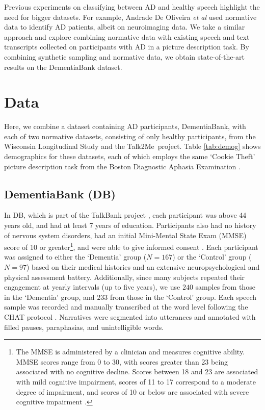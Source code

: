 \documentclass{article}
\newcommand{\talktome}{Talk2Me}
\begin{document}
Previous experiments on classifying between AD and healthy speech highlight the need for bigger datasets. For example, Andrade De Oliveira {\em et al} \cite{AndradeDeOliveira2014} used normative data to identify AD patients, albeit on neuroimaging data. We take a similar approach and explore combining normative data with existing speech and text transcripts collected on participants with AD in a picture description task. By combining synthetic sampling and normative data, we obtain state-of-the-art results on the DementiaBank dataset.


\section{Data}
Here, we combine a dataset containing AD participants, DementiaBank, with each of two normative datasets, consisting of only healthy participants, from the Wisconsin Longitudinal Study and the \talktome\ project. Table \ref{tab:demog} shows demographics for these datasets, each of which employs the same `Cookie Theft' picture description task from the Boston Diagnostic Aphasia Examination \cite{Goodglass1983}.

\subsection{DementiaBank (DB)}
In DB, which is part of the TalkBank project \cite{MacWhinney11}, each participant was above 44 years old, and had at least 7 years of education. Participants also had no history of nervous system disorders, had an initial Mini-Mental State Exam (MMSE) score of 10 or greater\footnote{The MMSE is administered by a clinician and measures cognitive ability. MMSE scores range from 0 to 30, with scores greater than 23 being associated with no cognitive decline. Scores between 18 and 23 are associated with mild cognitive impairment, scores of 11 to 17 correspond to a moderate degree of impairment, and scores of 10 or below are associated with severe cognitive impairment \cite{Folstein1975}.}, and were able to give informed consent \cite{Becker1994}. Each participant was assigned to either the `Dementia' group ($N=167$) or the `Control' group ($N=97$) based on their medical histories and an extensive neuropsychological and physical assessment battery. Additionally, since many subjects repeated their engagement at yearly intervals (up to five years), we use $240$ samples from those in the `Dementia' group, and $233$ from those in the `Control' group. Each speech sample was recorded and manually transcribed at the word level following the CHAT protocol \cite{MacWhinney1992}. Narratives were segmented into utterances and annotated with filled pauses, paraphasias, and unintelligible words. 
\end{document}
